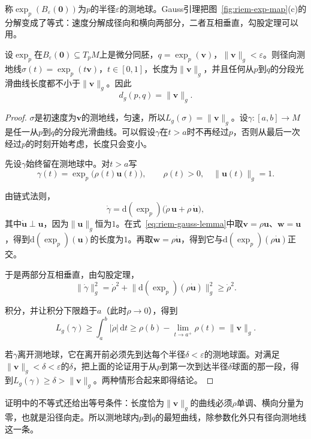 称$\exp_p(B_\varepsilon(\bm 0))$为$p$的半径$\varepsilon$的测地球。Gauss引理把图~\ref{fig:riem-exp-map}(c)的分解变成了等式：速度分解成径向和横向两部分，二者互相垂直，勾股定理可以用。

\begin{theorem}[径向测地线的最短性]
\label{thm:riem-radial-minimizing}
设$\exp_p$在$B_\varepsilon(\bm 0)\subseteq T_pM$上是微分同胚，$q=\exp_p(\bm v)$，$\lVert\bm v\rVert_g<\varepsilon$。则径向测地线$\sigma(t)=\exp_p(t\bm v)$，$t\in[0,1]$，长度为$\lVert\bm v\rVert_g$，并且任何从$p$到$q$的分段光滑曲线长度都不小于$\lVert\bm v\rVert_g$。因此
\begin{equation}
d_g(p,q)=\lVert\bm v\rVert_g .
\label{eq:riem-radial-distance}
\end{equation}
\end{theorem}

\begin{proof}
$\sigma$是初速度为$\bm v$的测地线，匀速，所以$L_g(\sigma)=\lVert\bm v\rVert_g$。设$\gamma:[a,b]\to M$是任一从$p$到$q$的分段光滑曲线。可以假设$\gamma$在$t>a$时不再经过$p$，否则从最后一次经过$p$的时刻开始考虑，长度只会变小。

先设$\gamma$始终留在测地球中。对$t>a$写
\[
\gamma(t)=\exp_p\bigl(\rho(t)\bm u(t)\bigr),\qquad\rho(t)>0,\quad\lVert\bm u(t)\rVert_g=1 .
\]

由链式法则，
\[
\dot\gamma=\mathrm d(\exp_p)\bigl(\dot\rho\,\bm u+\rho\,\dot{\bm u}\bigr),
\]
其中$\dot{\bm u}\perp\bm u$，因为$\lVert\bm u\rVert_g$恒为$1$。在式~\eqref{eq:riem-gauss-lemma}中取$\bm v=\rho\bm u$、$\bm w=\bm u$，得到$\mathrm d(\exp_p)(\bm u)$的长度为$1$。再取$\bm w=\rho\dot{\bm u}$，得到它与$\mathrm d(\exp_p)(\rho\dot{\bm u})$正交。

于是两部分互相垂直，由勾股定理，
\[
\lVert\dot\gamma\rVert_g^2=\dot\rho^2+\bigl\lVert\mathrm d(\exp_p)(\rho\dot{\bm u})\bigr\rVert_g^2\geq\dot\rho^2 .
\]

积分，并让积分下限趋于$a$（此时$\rho\to0$），得到
\[
L_g(\gamma)\geq\int_a^b\lvert\dot\rho\rvert\,\mathrm dt\geq\rho(b)-\lim_{t\to a^+}\rho(t)=\lVert\bm v\rVert_g .
\]

若$\gamma$离开测地球，它在离开前必须先到达每个半径$\delta<\varepsilon$的测地球面。对满足$\lVert\bm v\rVert_g<\delta<\varepsilon$的$\delta$，把上面的论证用于从$p$到第一次到达半径$\delta$球面的那一段，得到$L_g(\gamma)\geq\delta>\lVert\bm v\rVert_g$。两种情形合起来即得结论。
\end{proof}

证明中的不等式还给出等号条件：长度恰为$\lVert\bm v\rVert_g$的曲线必须$\rho$单调、横向分量为零，也就是沿径向走。所以测地球内$p$到$q$的最短曲线，除参数化外只有径向测地线这一条。


